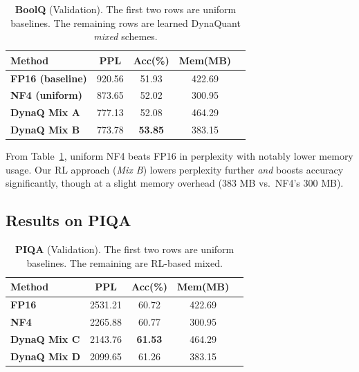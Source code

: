 \documentclass{article}
\begin{document}
	\begin{table}[ht]
		\centering
		\caption{\small \textbf{BoolQ} (Validation). The first two rows are uniform baselines. The remaining rows are learned DynaQuant \emph{mixed} schemes.}
		\label{tab:boolq}
		\begin{tabular}{lcccc}
			\toprule
			\textbf{Method} & \textbf{PPL} & \textbf{Acc(\%)} & \textbf{Mem(MB)} \\
			\midrule
			\textbf{FP16 (baseline)}  & 920.56 & 51.93 & 422.69 \\
			\textbf{NF4 (uniform)}    & 873.65 & 52.02 & 300.95 \\
			\midrule
			\textbf{DynaQ Mix A}  & 777.13 & 52.08 & 464.29 \\
			\textbf{DynaQ Mix B}  & 773.78 & \textbf{53.85} & 383.15 \\
			\bottomrule
		\end{tabular}
		\vspace{-1em}
	\end{table}
	
	From Table~\ref{tab:boolq}, uniform NF4 beats FP16 in perplexity with notably lower memory usage. Our RL approach (\emph{Mix B}) lowers perplexity further \emph{and} boosts accuracy significantly, though at a slight memory overhead (383 MB vs.\ NF4’s 300 MB). 
	
	\subsection{Results on PIQA}
	
	\begin{table}[ht]
		\centering
		\caption{\small \textbf{PIQA} (Validation). The first two rows are uniform baselines. The remaining are RL-based mixed.}
		\label{tab:piqa}
		\begin{tabular}{lcccc}
			\toprule
			\textbf{Method} & \textbf{PPL} & \textbf{Acc(\%)} & \textbf{Mem(MB)} \\
			\midrule
			\textbf{FP16}    & 2531.21 & 60.72 & 422.69 \\
			\textbf{NF4}     & 2265.88 & 60.77 & 300.95 \\
			\midrule
			\textbf{DynaQ Mix C} & 2143.76 & \textbf{61.53} & 464.29 \\
			\textbf{DynaQ Mix D} & 2099.65 & 61.26 & 383.15 \\
			\bottomrule
		\end{tabular}
		\vspace{-0.5em}
	\end{table}
	
\end{document}
